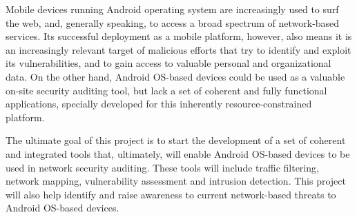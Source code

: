 Mobile devices running Android operating system are increasingly used to surf the web, and, generally speaking, to access a broad spectrum of network-based services. Its successful deployment as a mobile platform, however, also means it is an increasingly relevant target of malicious efforts that try to identify and exploit its vulnerabilities, and to gain access to valuable personal and organizational data. On the other hand, Android OS-based devices could be used as a valuable on-site security auditing tool, but lack a set of coherent and fully functional applications, specially developed for this inherently resource-constrained platform.

The ultimate goal of this project is to start the development of a set of coherent and integrated tools that, ultimately, will enable Android OS-based devices to be used in network security auditing. These tools will include traffic filtering, network mapping, vulnerability assessment and intrusion detection. This project will also help identify and raise awareness to current network-based threats to Android OS-based devices.
